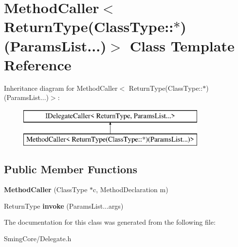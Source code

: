 \hypertarget{class_method_caller_3_01_return_type_07_class_type_1_1_5_08_07_params_list_8_8_8_08_4}{}\section{Method\+Caller$<$ Return\+Type(Class\+Type\+:\+:$\ast$)(Params\+List...)$>$ Class Template Reference}
\label{class_method_caller_3_01_return_type_07_class_type_1_1_5_08_07_params_list_8_8_8_08_4}
Inheritance diagram for Method\+Caller$<$ Return\+Type(Class\+Type\+:\+:$\ast$)(Params\+List...)$>$\+:\begin{figure}[H]
\begin{center}
\leavevmode
\includegraphics[height=2.000000cm]{class_method_caller_3_01_return_type_07_class_type_1_1_5_08_07_params_list_8_8_8_08_4}
\end{center}
\end{figure}
\subsection*{Public Member Functions}
\begin{DoxyCompactItemize}
\item 
\hypertarget{class_method_caller_3_01_return_type_07_class_type_1_1_5_08_07_params_list_8_8_8_08_4_a1438e54a0922ae6473a48e0183f95c2d}{}{\bfseries Method\+Caller} (Class\+Type $\ast$c, Method\+Declaration m)\label{class_method_caller_3_01_return_type_07_class_type_1_1_5_08_07_params_list_8_8_8_08_4_a1438e54a0922ae6473a48e0183f95c2d}

\item 
\hypertarget{class_method_caller_3_01_return_type_07_class_type_1_1_5_08_07_params_list_8_8_8_08_4_afb12bfdaa1c645537c1d09a6c67e1658}{}Return\+Type {\bfseries invoke} (Params\+List...\+args)\label{class_method_caller_3_01_return_type_07_class_type_1_1_5_08_07_params_list_8_8_8_08_4_afb12bfdaa1c645537c1d09a6c67e1658}

\end{DoxyCompactItemize}


The documentation for this class was generated from the following file\+:\begin{DoxyCompactItemize}
\item 
Sming\+Core/Delegate.\+h\end{DoxyCompactItemize}
